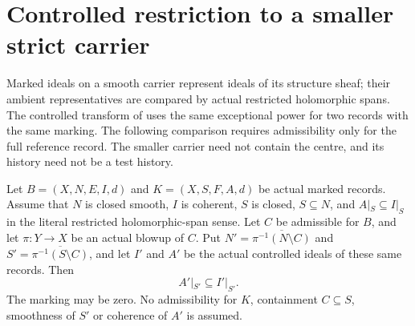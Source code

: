 \section{Controlled restriction to a smaller strict carrier}

Marked ideals on a smooth carrier represent ideals of its structure sheaf;
their ambient representatives are compared by actual restricted holomorphic
spans. The controlled transform of \cite[Definition~2.2]{bierstone-milman08-functoriality}
uses the same exceptional power for two records with the same marking.
The following comparison requires admissibility only for the full reference
record. The smaller carrier need not contain the centre, and its history
need not be a test history.

\begin{theorem}
\label{hir:original-controlled-reference-restriction-step}
\leanok
Let $B=(X,N,E,I,d)$ and $K=(X,S,F,A,d)$ be actual marked records.
Assume that $N$ is closed smooth, $I$ is coherent, $S$ is closed,
$S\subseteq N$, and $A|_S\subseteq I|_S$ in the literal restricted
holomorphic-span sense. Let $C$ be admissible for $B$, and let
$\pi:Y\to X$ be an actual blowup of $C$. Put
$N'=\overline{\pi^{-1}(N\setminus C)}$ and
$S'=\overline{\pi^{-1}(S\setminus C)}$, and let $I'$ and $A'$ be the
actual controlled ideals of these same records. Then
\[
                 A'|_{S'}\subseteq I'|_{S'}.
\]
The marking may be zero. No admissibility for $K$, containment $C\subseteq S$,
smoothness of $S'$ or coherence of $A'$ is assumed.
\end{theorem}
